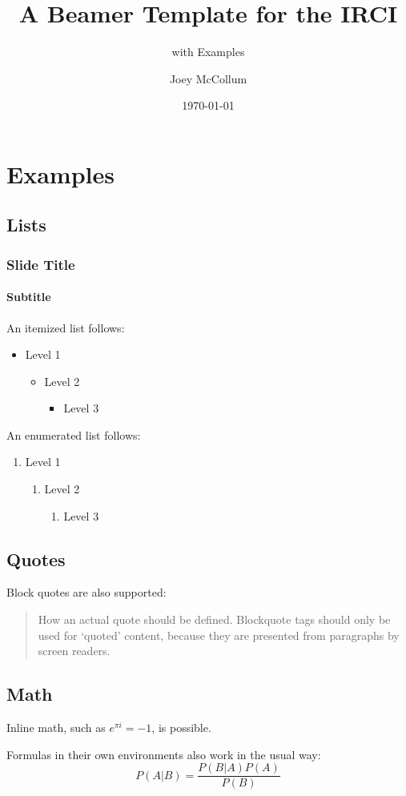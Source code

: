 \documentclass[11pt]{beamer}
\title{A Beamer Template for the IRCI}%
\subtitle{with Examples} %
\date{\today}%
\author{Joey McCollum}%
\institute{Institute for Religion and Critical Inquiry\\Australian Catholic University}%
\begin{document}
	\begin{frame}
		\titlepage
	\end{frame}
	\section{Examples}
	\subsection{Lists}
	\begin{frame}
		\frametitle{Slide Title}
		\framesubtitle{Subtitle}
		An itemized list follows:
		\begin{itemize}
			\item Level 1
			\begin{itemize}
				\item Level 2
				\begin{itemize}
					\item Level 3
				\end{itemize}
			\end{itemize}
		\end{itemize}
		\vspace{\baselineskip}

		An enumerated list follows:
		\begin{enumerate}
			\item Level 1
			\begin{enumerate}
				\item Level 2
				\begin{enumerate}
					\item Level 3
				\end{enumerate}
			\end{enumerate}
		\end{enumerate}
	\end{frame}
	\subsection{Quotes}
	\begin{frame}
		Block quotes are also supported:
		\begin{quote}
			How an actual quote should be defined. Blockquote tags should only be used for `quoted' content, because they are presented from paragraphs by screen readers.
		\end{quote}
	\end{frame}
	\subsection{Math}
	\begin{frame}
		Inline math, such as $e^{\pi i} = -1$, is possible.\par
		\vspace{\baselineskip}

		Formulas in their own environments also work in the usual way:
		\begin{equation}
			P(A|B)=\frac{P(B|A)P(A)}{P(B)}
		\end{equation}
	\end{frame}
	
\end{document}
